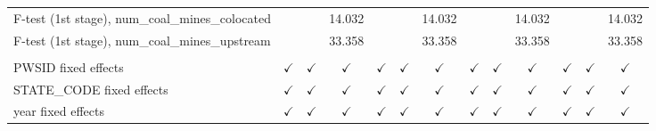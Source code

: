 \begin{table}[htbp]
\begin{adjustbox}{width = \textwidth, center}
\begin{tabular}{lcccccccccccc}
         F-test (1st stage), num\_coal\_mines\_colocated    &               &                       & 14.032                &               &                & 14.032        &               &                       & 14.032                &                       &                 & 14.032\\  
         F-test (1st stage), num\_coal\_mines\_upstream     &               &                       & 33.358                &               &                & 33.358        &               &                       & 33.358                &                       &                 & 33.358\\  
          \\
         PWSID fixed effects                                & $\checkmark$  & $\checkmark$          & $\checkmark$          & $\checkmark$  & $\checkmark$   & $\checkmark$  & $\checkmark$  & $\checkmark$          & $\checkmark$          & $\checkmark$          & $\checkmark$    & $\checkmark$\\   
         STATE\_CODE fixed effects                          & $\checkmark$  & $\checkmark$          & $\checkmark$          & $\checkmark$  & $\checkmark$   & $\checkmark$  & $\checkmark$  & $\checkmark$          & $\checkmark$          & $\checkmark$          & $\checkmark$    & $\checkmark$\\   
         year fixed effects                                 & $\checkmark$  & $\checkmark$          & $\checkmark$          & $\checkmark$  & $\checkmark$   & $\checkmark$  & $\checkmark$  & $\checkmark$          & $\checkmark$          & $\checkmark$          & $\checkmark$    & $\checkmark$\\   
         \bottomrule
      \end{tabular}
   \end{adjustbox}
\end{table}


